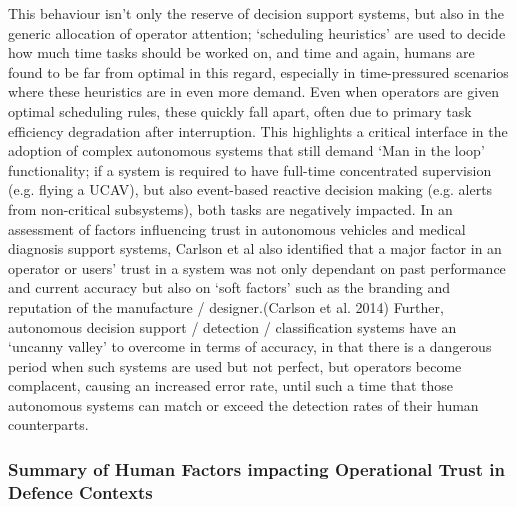 This behaviour isn’t only the reserve of decision support systems, but also in the generic allocation of operator attention; ‘scheduling heuristics’ are used to decide how much time tasks should be worked on, and time and again, humans are found to be far from optimal in this regard, especially in time-pressured scenarios where these heuristics are in even more demand. Even when operators are given optimal scheduling rules, these quickly fall apart, often due to primary task efficiency degradation after interruption.
This highlights a critical interface in the adoption of complex autonomous systems that still demand ‘Man in the loop’ functionality; if a system is required to have full-time concentrated supervision (e.g. flying a UCAV), but also event-based reactive decision making (e.g. alerts from non-critical subsystems), both tasks are negatively impacted.
In an assessment of factors influencing trust in autonomous vehicles and medical diagnosis support systems, Carlson et al also identified that a major factor in an operator or users’ trust in a system was not only dependant on past performance and current accuracy but also on ‘soft factors’ such as the branding and reputation of the manufacture / designer.(Carlson et al. 2014)
Further, autonomous decision support / detection / classification systems have an ‘uncanny valley’ to overcome in terms of accuracy, in that there is a dangerous period when such systems are used but not perfect, but operators become complacent, causing an increased error rate, until such a time that those autonomous systems can match or exceed the detection rates of their human counterparts.

\subsubsection{Summary of Human Factors impacting Operational Trust in Defence Contexts}

